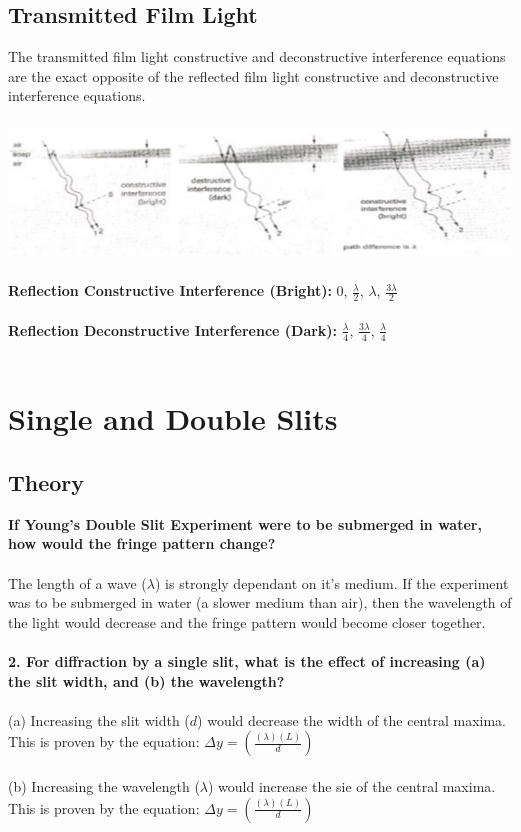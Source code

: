 \documentclass{article}
\begin{document}
\subsection{Transmitted Film Light}
The transmitted film light constructive and deconstructive interference equations are the exact opposite of the reflected film light constructive and deconstructive interference equations.\\\\
\includegraphics[scale=0.5]{images/transmitted_films} \\\\
\noindent \textbf{Reflection Constructive Interference (Bright):} $0$, $\frac{\lambda}{2}$, $\lambda$, $\frac{3\lambda}{2}$ \\\\
\textbf{Reflection Deconstructive Interference (Dark):} $\frac{\lambda}{4}$, $\frac{3\lambda}{4}$, $\frac{\lambda}{4}$ \\\\

\section{Single and Double Slits}
\subsection{Theory}
\textbf{If Young's Double Slit Experiment were to be submerged in water, how would the fringe pattern change?}\\\\
The length of a wave ($\lambda$) is strongly dependant on it's medium. If the experiment was to be submerged in water (a slower medium than air), then the wavelength of the light would decrease and the fringe pattern would become closer together.\\\\

\noindent\textbf{2. For diffraction by a single slit, what is the effect of increasing (a) the slit width, and (b) the wavelength?}\\\\
(a) Increasing the slit width ($d$) would decrease the width of the central maxima. This is proven by the equation: $\Delta y = \left(\frac{(\lambda)(L)}{d}\right)$\\\\
(b) Increasing the wavelength ($\lambda$) would increase the sie of the central maxima. This is proven by the equation: $\Delta y = \left(\frac{(\lambda)(L)}{d}\right)$\\\\
\end{document}
